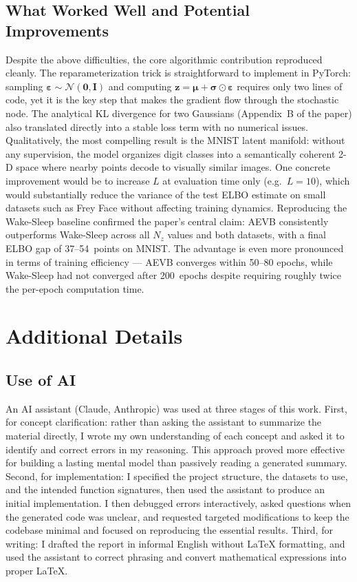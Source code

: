 \documentclass{article}
\begin{document}
\subsection{What Worked Well and Potential Improvements}
Despite the above difficulties, the core algorithmic contribution reproduced
cleanly. The reparameterization trick is straightforward to implement in PyTorch:
sampling $\boldsymbol{\varepsilon} \sim \mathcal{N}(\mathbf{0}, \mathbf{I})$ and
computing $\mathbf{z} = \boldsymbol{\mu} + \boldsymbol{\sigma} \odot
\boldsymbol{\varepsilon}$ requires only two lines of code, yet it is the key step
that makes the gradient flow through the stochastic node. The analytical KL
divergence for two Gaussians (Appendix~B of the paper) also translated directly
into a stable loss term with no numerical issues. Qualitatively, the most
compelling result is the MNIST latent manifold: without any supervision, the model
organizes digit classes into a semantically coherent 2-D space where nearby points
decode to visually similar images.
One concrete improvement would be to increase $L$ at evaluation time only (e.g.\
$L = 10$), which would substantially reduce the variance of the test ELBO estimate
on small datasets such as Frey Face without affecting training dynamics.
Reproducing the Wake-Sleep baseline confirmed the paper's central claim: AEVB
consistently outperforms Wake-Sleep across all $N_z$ values and both datasets, with
a final ELBO gap of 37--54~points on MNIST. The advantage is even more pronounced
in terms of training efficiency --- AEVB converges within 50--80 epochs, while
Wake-Sleep had not converged after 200~epochs despite requiring roughly twice the
per-epoch computation time.

\appendix
\section{Additional Details}
\subsection{Use of AI}

An AI assistant (Claude, Anthropic) was used at three stages of this work.
First, for concept clarification: rather than asking the assistant to summarize
the material directly, I wrote my own understanding of each concept and asked it
to identify and correct errors in my reasoning. This approach proved more effective
for building a lasting mental model than passively reading a generated summary.
Second, for implementation: I specified the project structure, the datasets to use,
and the intended function signatures, then used the assistant to produce an initial
implementation. I then debugged errors interactively, asked questions when the
generated code was unclear, and requested targeted modifications to keep the
codebase minimal and focused on reproducing the essential results.
Third, for writing: I drafted the report in informal English without \LaTeX{}
formatting, and used the assistant to correct phrasing and convert mathematical
expressions into proper \LaTeX{}.



\end{document}
